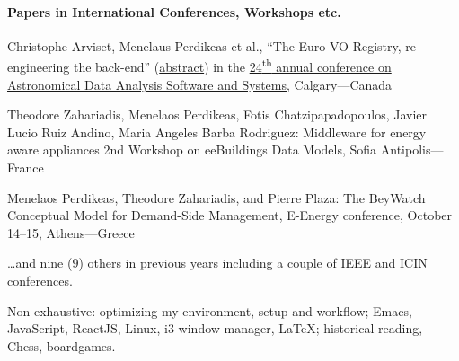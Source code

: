 \documentclass[10pt,a4paper]{article} %
\begin{document}
\paragraph{Papers in International Conferences, Workshops etc.}
\begin{description}
\item[2014] Christophe Arviset, Menelaus Perdikeas et al., ``The Euro-VO Registry, re-engineering the back-end'' (\href{http://adsabs.harvard.edu/abs/2015ASPC..495..457A}{abstract}) in the \href{http://www.adass2014.org/announcements_en.php}{24\textsuperscript{th} annual conference on Astronomical Data Analysis Software and Systems}, Calgary---Canada
\item[2011] Theodore Zahariadis, Menelaos Perdikeas, Fotis Chatzipapadopoulos, Javier Lucio Ruiz Andino,
  Maria Angeles Barba Rodriguez: Middleware for energy aware appliances
  2nd Workshop on eeBuildings Data Models, Sofia Antipolis---France
\item[2010] Menelaos Perdikeas, Theodore Zahariadis, and Pierre Plaza: The BeyWatch Conceptual Model for Demand-Side Management, E-Energy conference, October 14--15, Athens---Greece

\item \ldots and nine (9) others in previous years including a couple of IEEE and \href{http://www.icin.co.uk/}{ICIN}
  conferences.
  
\end{description}

\spacedhrule{1.6em}{-0.4em} %



\inlineheadsection %
{Non-exhaustive:}
{optimizing my environment, setup and workflow; Emacs, JavaScript, ReactJS, Linux, i3 window manager, \LaTeX; historical reading, Chess, boardgames.}

\end{document}
